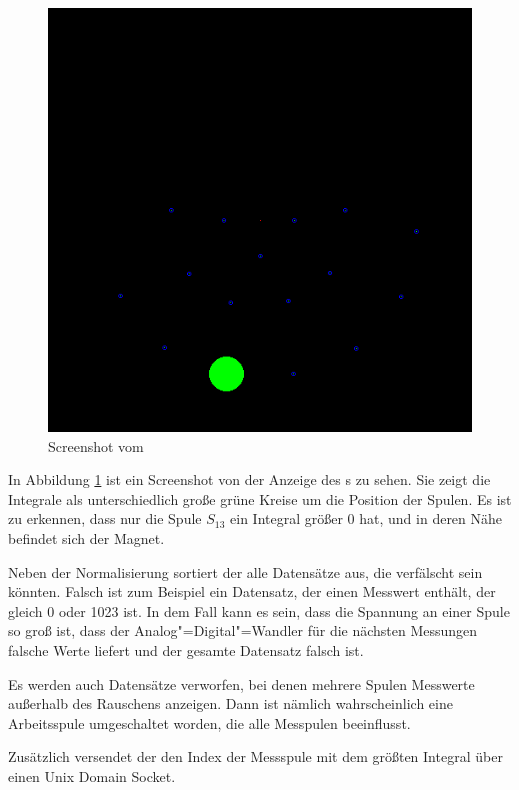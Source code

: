 \begin{figure}[hbt]
  \centering
  \includegraphics[width=\textwidth]{images/tracker.png}
  \caption{Screenshot vom }
  \label{fig:screentracker}
\end{figure}

In Abbildung \ref{fig:screentracker} ist ein Screenshot von der Anzeige des s zu sehen.
Sie zeigt die Integrale als unterschiedlich große grüne Kreise um die Position der Spulen.
Es ist zu erkennen, dass nur die Spule $S_{13}$ ein Integral größer 0 hat, und in deren Nähe befindet sich der Magnet.

Neben der Normalisierung sortiert der  alle Datensätze aus, die verfälscht sein könnten.
Falsch ist zum Beispiel ein Datensatz, der einen Messwert enthält, der gleich 0 oder 1023 ist. In dem Fall kann es sein, dass die Spannung an einer Spule so groß ist, dass der Analog"=Digital"=Wandler für die nächsten Messungen falsche Werte liefert und der gesamte Datensatz falsch ist.

Es werden auch Datensätze verworfen, bei denen mehrere Spulen Messwerte außerhalb des Rauschens anzeigen.
Dann ist nämlich wahrscheinlich eine Arbeitsspule umgeschaltet worden, die alle Messpulen beeinflusst.

Zusätzlich versendet der  den Index der Messspule mit dem größten Integral über einen Unix Domain Socket.

